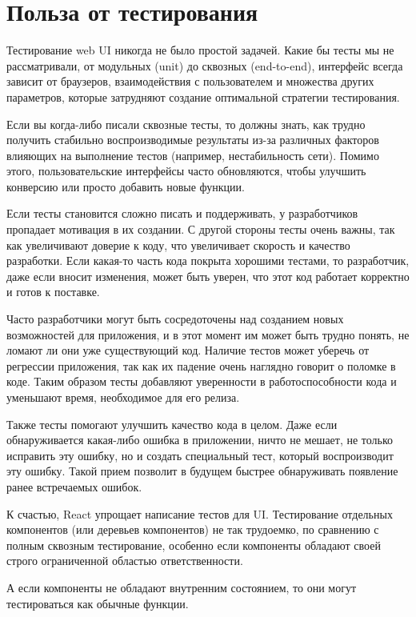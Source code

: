 \section{Польза от тестирования}

Тестирование web UI никогда не было простой задачей. Какие бы тесты мы не рассматривали, от модульных (unit) до сквозных (end-to-end), интерфейс всегда зависит от браузеров, взаимодействия с пользователем и множества других параметров, которые затрудняют создание оптимальной стратегии тестирования. 

Если вы когда-либо писали сквозные тесты, то должны знать, как трудно получить стабильно воспроизводимые результаты из-за различных факторов влияющих на выполнение тестов (например, нестабильность сети). Помимо этого, пользовательские интерфейсы часто обновляются, чтобы улучшить конверсию или просто добавить новые функции.

Если тесты становится сложно писать и поддерживать, у разработчиков пропадает мотивация в их создании. С другой стороны тесты очень важны, так как увеличивают доверие к коду, что увеличивает скорость и качество разработки. Если какая-то часть кода покрыта хорошими тестами, то разработчик, даже если вносит изменения, может быть уверен, что этот код работает корректно и готов к поставке. 

Часто разработчики могут быть сосредоточены над созданием новых возможностей для приложения, и в этот момент им может быть трудно понять, не ломают ли они уже существующий код. Наличие тестов может уберечь от регрессии приложения, так как их падение очень наглядно говорит о поломке в коде. Таким образом тесты добавляют уверенности в работоспособности кода и уменьшают время, необходимое для его релиза. 

Также тесты помогают улучшить качество кода в целом. Даже если обнаруживается какая-либо ошибка в приложении, ничто не мешает, не только исправить эту ошибку, но и создать специальный тест, который воспроизводит эту ошибку. Такой прием позволит в будущем быстрее обнаруживать появление ранее встречаемых ошибок.

К счастью, React упрощает написание тестов для UI. Тестирование отдельных компонентов (или деревьев компонентов) не так трудоемко, по сравнению с полным сквозным тестирование, особенно если компоненты обладают своей строго ограниченной областью ответственности.

А если компоненты не обладают внутренним состоянием, то они могут тестироваться как обычные функции.

